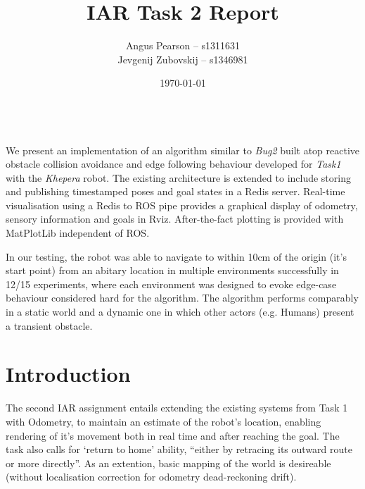 \documentclass[11pt, a4paper]{article}
\renewenvironment{abstract}{%
{\mdseries\scshape\Large\abstractname}
\vspace{1em}\\
}{\par\noindent}
\begin{document}
\title{IAR Task 2 Report}
\author{Angus Pearson -- s1311631\\ Jevgenij Zubovskij -- s1346981}
\date{\today}
\maketitle



\begin{abstract}
  We present an implementation of an algorithm similar to \textit{Bug2} \cite{principlesrobot} 
  built atop reactive obstacle collision avoidance and edge following behaviour developed for 
  \textit{Task1} with the \textit{Khepera} robot. The existing architecture is extended to
  include storing and publishing timestamped poses and goal states in a Redis \cite{Redis} server.
  Real-time visualisation using a Redis to ROS \cite{ROS} pipe provides a graphical display 
  of odometry, sensory information and goals in Rviz. After-the-fact plotting is provided 
  with MatPlotLib independent of ROS.

  In our testing, the robot was able to navigate to within 10cm of the origin (it's start point) 
  from an abitary location in multiple environments successfully in 12/15 experiments, where each 
  environment was designed to evoke edge-case behaviour considered hard for the algorithm. The 
  algorithm performs comparably in a static world and a dynamic one in which other actors 
  (e.g. Humans) present a transient obstacle. 
\end{abstract}



\section{Introduction}
\label{Introduction}

The second IAR assignment entails extending the existing systems from Task 1 with Odometry, 
to maintain an estimate of the robot's location, enabling rendering of it's movement both 
in real time and after reaching the goal. The task also calls for `return to home' ability, 
``either by retracing its outward route or more directly''. As an extention, basic mapping 
of the world is desireable (without localisation correction for odometry dead-reckoning drift). 
\end{document}
